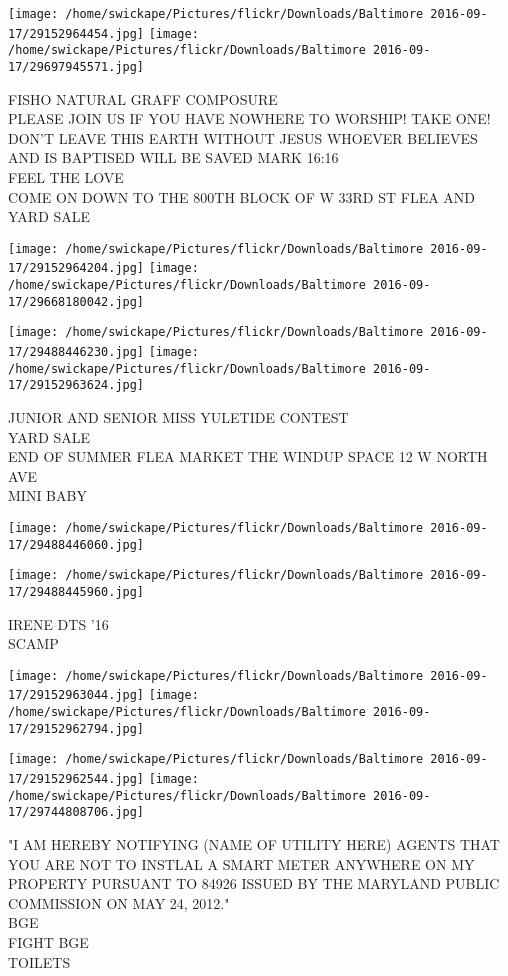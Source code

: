 \documentclass[10pt,letterpaper]{article}
\begin{document}
\texttt{[image: /home/swickape/Pictures/flickr/Downloads/Baltimore 2016-09-17/29152964454.jpg]}
\texttt{[image: /home/swickape/Pictures/flickr/Downloads/Baltimore 2016-09-17/29697945571.jpg]}

FISHO NATURAL GRAFF COMPOSURE\\
PLEASE JOIN US IF YOU HAVE NOWHERE TO WORSHIP!  TAKE ONE!  DON'T LEAVE THIS EARTH WITHOUT JESUS WHOEVER BELIEVES AND IS BAPTISED WILL BE SAVED MARK 16:16\\
FEEL THE LOVE\\
COME ON DOWN TO THE 800TH BLOCK OF W 33RD ST FLEA AND YARD SALE
\pagebreak

\texttt{[image: /home/swickape/Pictures/flickr/Downloads/Baltimore 2016-09-17/29152964204.jpg]}
\texttt{[image: /home/swickape/Pictures/flickr/Downloads/Baltimore 2016-09-17/29668180042.jpg]}

\texttt{[image: /home/swickape/Pictures/flickr/Downloads/Baltimore 2016-09-17/29488446230.jpg]}
\texttt{[image: /home/swickape/Pictures/flickr/Downloads/Baltimore 2016-09-17/29152963624.jpg]}

JUNIOR AND SENIOR MISS YULETIDE CONTEST\\
YARD SALE\\
END OF SUMMER FLEA MARKET THE WINDUP SPACE 12 W NORTH AVE\\
MINI BABY
\pagebreak

\texttt{[image: /home/swickape/Pictures/flickr/Downloads/Baltimore 2016-09-17/29488446060.jpg]}

\vspace{0.25in}
\texttt{[image: /home/swickape/Pictures/flickr/Downloads/Baltimore 2016-09-17/29488445960.jpg]}

IRENE DTS '16\\
SCAMP
\pagebreak

\texttt{[image: /home/swickape/Pictures/flickr/Downloads/Baltimore 2016-09-17/29152963044.jpg]}
\texttt{[image: /home/swickape/Pictures/flickr/Downloads/Baltimore 2016-09-17/29152962794.jpg]}

\texttt{[image: /home/swickape/Pictures/flickr/Downloads/Baltimore 2016-09-17/29152962544.jpg]}
\texttt{[image: /home/swickape/Pictures/flickr/Downloads/Baltimore 2016-09-17/29744808706.jpg]}

"I AM HEREBY NOTIFYING (NAME OF UTILITY HERE) AGENTS THAT YOU ARE NOT TO INSTLAL A SMART METER ANYWHERE ON MY PROPERTY PURSUANT TO 84926 ISSUED BY THE MARYLAND PUBLIC COMMISSION ON MAY 24, 2012."\\
BGE\\
FIGHT BGE\\
TOILETS
\pagebreak
\end{document}

